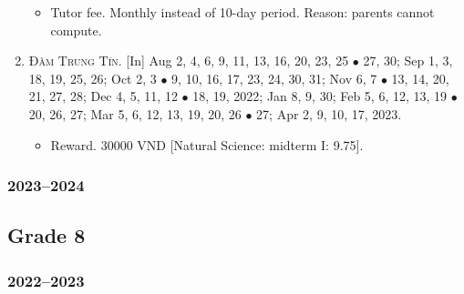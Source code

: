 \documentclass{article}
\begin{document}
\begin{enumerate}
	\begin{itemize}
		\item \textsf{Tutor fee.} Monthly instead of 10-day period. Reason: parents cannot compute.
	\end{itemize}
	\item \textsc{Đàm Trung Tín.} \textsf{[In]} Aug 2, 4, 6, 9, 11, 13, 16, 20, 23, 25 $\bullet$ 27, 30; Sep 1, 3, 18, 19, 25, 26; Oct 2, 3 $\bullet$ 9, 10, 16, 17, 23, 24, 30, 31; Nov 6, 7 $\bullet$ 13, 14, 20, 21, 27, 28; Dec 4, 5, 11, 12 $\bullet$ 18, 19, 2022; Jan 8, 9, 30; Feb 5, 6, 12, 13, 19 $\bullet$ 20, 26, 27; Mar 5, 6, 12, 13, 19, 20, 26 $\bullet$ 27; Apr 2, 9, 10, 17, 2023.
	\begin{itemize}
		\item \textsf{Reward.} 30000 VND [Natural Science: midterm I: 9.75].
	\end{itemize}
\end{enumerate}

\subsubsection{2023--2024}


\subsection{Grade 8}

\subsubsection{2022--2023}
\end{document}
